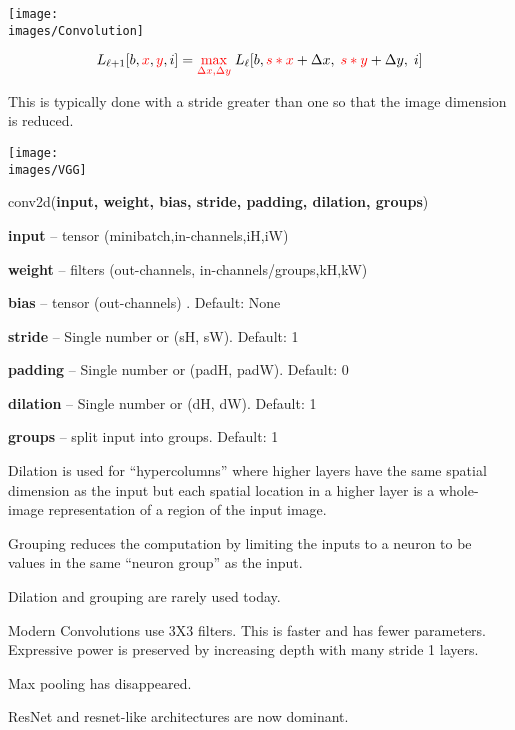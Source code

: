 {

\centerline{\texttt{[image: \\images/Convolution]}}

\vfill
$$L_{{\ell+1}}[b,{\color{red}x},{\color{red}y},i] = {\color{red} \max_{\Delta x, \Delta y}}\; L_{{\ell}}[b,{\color{red} s*x} + \Delta x,\; {\color{red} s*y} + \Delta y,\; i]$$

\vfill
This is typically done with a stride greater than one so that the image dimension is reduced.


\centerline{\texttt{[image: \\images/VGG]}}



conv2d({\bf input, weight, bias, stride, padding, dilation, groups})

\bigskip
{\bf input} – tensor (minibatch,in-channels,iH,iW)

\medskip
{\bf weight} – filters (out-channels, in-channels/groups,kH,kW)

\medskip
{\bf bias} – tensor (out-channels) . Default: None

\medskip
{\bf stride} – Single number or (sH, sW). Default: 1

\medskip
{\bf padding} – Single number or (padH, padW). Default: 0

\medskip
{\bf dilation} – Single number or (dH, dW). Default: 1

\medskip
{\bf groups} – split input into groups. Default: 1


Dilation is used for ``hypercolumns'' where higher layers have the same spatial dimension as the input but each spatial location in a higher layer
is a whole-image representation of a region of the input image.

\vfill
Grouping reduces the computation by limiting the inputs to a neuron to be values in the same ``neuron group'' as the input.

\vfill
Dilation and grouping are rarely used today.


Modern Convolutions use 3X3 filters.  This is faster and has fewer parameters.  Expressive power is preserved by increasing depth with many stride 1 layers.

\vfill
Max pooling has disappeared.

\vfill
ResNet and resnet-like architectures are now dominant.

}
